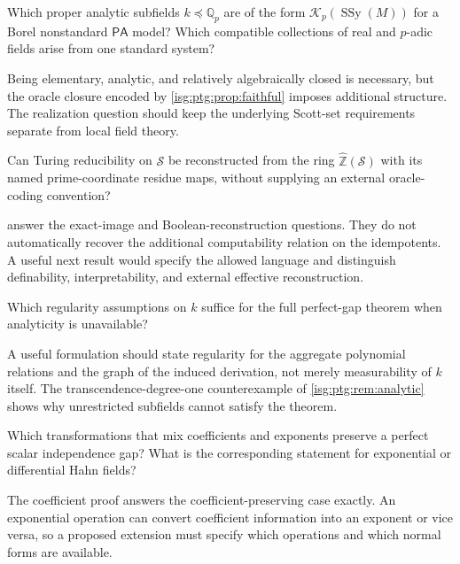 \documentclass[11pt]{article}
\theoremstyle{definition}
\theoremstyle{remark}
\newcommand{\Z}{\mathbb{Z}}
\newcommand{\Zhat}{\widehat{\Z}}
\newcommand{\Qp}{\mathbb{Q}_p}
\newcommand{\PA}{\mathsf{PA}}
\newcommand{\SSy}{\operatorname{SSy}}
\begin{document}
\begin{question}\label{isg:ptg:q:realization}
Which proper analytic subfields $k\preccurlyeq\Qp$ are of the form
$\mathcal K_p(\SSy(M))$ for a Borel nonstandard $\PA$ model? Which
compatible collections of real and $p$-adic fields arise from one standard
system?
\end{question}
Being elementary, analytic, and relatively algebraically closed is
necessary, but the oracle closure encoded by \cref{isg:ptg:prop:faithful}
imposes additional structure. The realization question should keep the
underlying Scott-set requirements separate from local field theory.

\begin{question}\label{isg:ptg:q:reconstruction}
Can Turing reducibility on $\mathcal S$ be reconstructed from the ring
$\Zhat(\mathcal S)$ with its named prime-coordinate residue maps, without
supplying an external oracle-coding convention?
\end{question}
 answer the exact-image
and Boolean-reconstruction questions. They do not automatically recover the
additional computability relation on the idempotents. A useful next result
would specify the allowed language and distinguish definability,
interpretability, and external effective reconstruction.

\begin{question}\label{isg:ptg:q:regularity}
Which regularity assumptions on $k$ suffice for the full perfect-gap
theorem when analyticity is unavailable?
\end{question}
A useful formulation should state regularity for the aggregate polynomial
relations and the graph of the induced derivation, not merely
measurability of $k$ itself. The transcendence-degree-one counterexample of
\cref{isg:ptg:rem:analytic} shows why unrestricted subfields cannot satisfy
the theorem.

\begin{question}\label{isg:ptg:q:beyond}
Which transformations that mix coefficients and exponents preserve a
perfect scalar independence gap? What is the corresponding statement for
exponential or differential Hahn fields?
\end{question}
The coefficient proof answers the coefficient-preserving case exactly. An
exponential operation can convert coefficient information into an exponent
or vice versa, so a proposed extension must specify which operations and
which normal forms are available.
\end{document}
